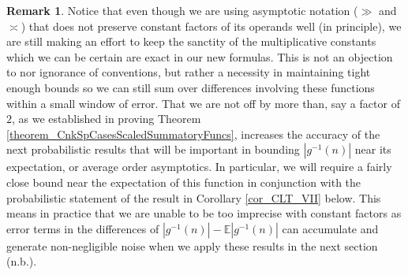 \documentclass[11pt,reqno,a4letter]{article}
\numberwithin{figure}{section}
\numberwithin{table}{section}
\theoremstyle{plain}
\numberwithin{theorem}{section}
\theoremstyle{definition}
\newtheorem{remark}[theorem]{Remark}
\begin{document}
\begin{remark} 
Notice that even though we are using asymptotic notation 
($\gg$ and $\asymp$) that does not preserve constant factors 
of its operands well (in principle), we are still making an effort to keep the 
sanctity of the multiplicative 
constants which we can be certain are exact in our new formulas. 
This is not an objection to 
nor ignorance of conventions, but rather a necessity in maintaining 
tight enough bounds so we can still sum over differences involving these functions 
within a small window of error. 
That we are not off by more than, say a factor of $2$, as we established in 
proving Theorem \ref{theorem_CnkSpCasesScaledSummatoryFuncs}, 
increases the accuracy of the next probabilistic results that will 
be important in bounding $|g^{-1}(n)|$ near its expectation, or average order asymptotics. 
In particular, we will require a fairly close bound near the expectation of this 
function in conjunction with the probabilistic statement of the result in 
Corollary \ref{cor_CLT_VII} below. 
This means in practice that we are unable to be too imprecise with constant factors as error terms 
in the differences of $|g^{-1}(n)| - \mathbb{E}|g^{-1}(n)|$ can accumulate and generate 
non-negligible noise when we apply these results in the next section (n.b.). 
\end{remark} 
\end{document}
